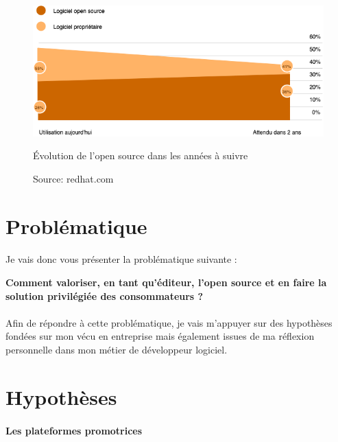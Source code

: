 					\begin{figure}[h]
						\center
						\includegraphics[scale=0.60]{./img/osinentreprise.png}
						\caption{Évolution de l'open source dans les années à suivre}
						\caption*{\color{silver}Source: redhat.com}					
					\end{figure}
					\clearpage

	\section{Problématique}
		\paragraph*{}

			Je vais donc vous présenter la problématique suivante :
			\begin{center}
				\begin{displayquote}
					\textbf{Comment valoriser, en tant qu'éditeur, l'open source et en faire la solution privilégiée des consommateurs ?}
				\end{displayquote}
			\end{center}

		\paragraph*{}
			
			Afin de répondre à cette problématique, je vais m'appuyer sur des hypothèses fondées sur mon vécu en entreprise mais également issues de ma réflexion personnelle dans mon métier de développeur logiciel.

	\section{Hypothèses}

		\paragraph{Les plateformes promotrices\\}

